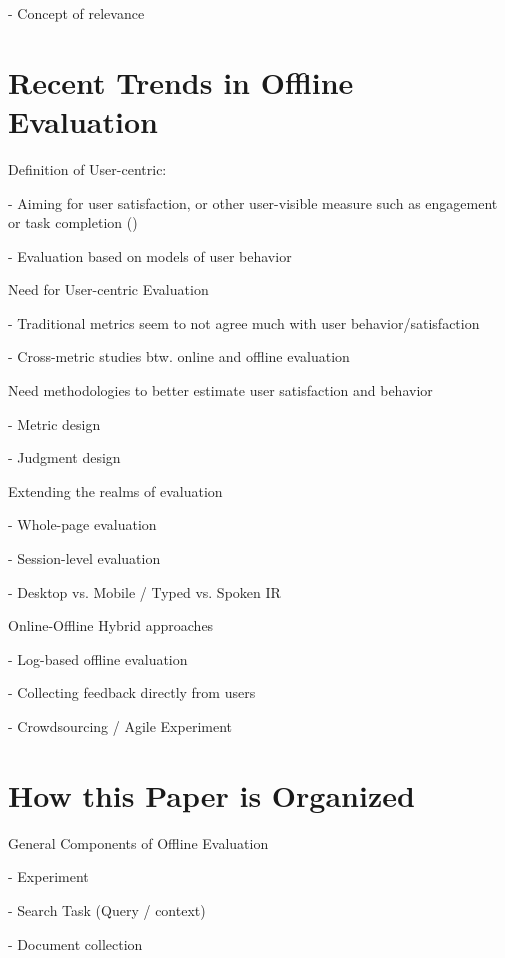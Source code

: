 \documentclass[openany]{now} %
\newcommand{\newpar}{\bigskip\noindent}
\begin{document}
- Concept of relevance 

\cite{borlund2003} \cite{cleverdon67} \cite{voor:trec05}

\section{Recent Trends in Offline Evaluation}

Definition of User-centric:

- Aiming for user satisfaction, or other user-visible measure such as engagement or task completion (\cite{scholer13})

- Evaluation based on models of user behavior

\newpar
Need for User-centric Evaluation

- Traditional metrics seem to not agree much with user behavior/satisfaction
 \cite{Al-Maskari2007} 

- Cross-metric studies btw. online and offline evaluation \cite{radl:comp10}

\newpar
Need methodologies to better estimate user satisfaction and behavior

-	Metric design \cite{YilmazSCR10, CarteretteKY11, ChapelleMZG09}

-	Judgment design \cite{VermaY16, VermaYC16}

\newpar
Extending the realms of evaluation

-	Whole-page evaluation \cite{Zhou:2012}

-	Session-level evaluation \cite{KanoulasCCS11, CarteretteKHC14}

-	Desktop vs. Mobile / Typed vs. Spoken IR \cite{VermaYC16}

\newpar
Online-Offline Hybrid approaches

- Log-based offline evaluation \cite{Li:2015} \cite{li2010contextual}

- Collecting feedback directly from users \cite{Kim2016}

- Crowdsourcing / Agile Experiment

\section{How this Paper is Organized}

General Components of Offline Evaluation

-	Experiment

-	Search Task (Query / context)

- 	Document collection 
\end{document}
